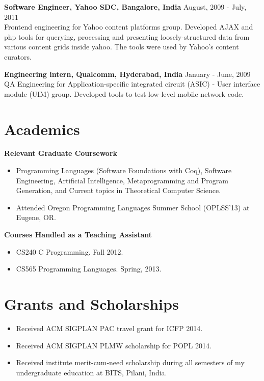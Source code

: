 \documentclass[margin,line]{res}
\begin{document}
\begin{resume}
{\bf Software Engineer, Yahoo SDC, Bangalore, India} \hfill August, 2009 -
July, 2011\\
Frontend engineering for Yahoo content platforms group. Developed AJAX
and php tools for querying, processing and presenting
loosely-structured data from various content grids inside yahoo. The
tools were used by Yahoo's content curators.

{\bf Engineering intern, Qualcomm, Hyderabad, India} \hfill January - June, 2009\\
QA Engineering for Application-specific integrated circuit (ASIC) -
User interface module (UIM) group. Developed tools to test low-level
mobile network code.\\

\section{Academics}
{\bf Relevant Graduate Coursework }\\
\begin{itemize}
\item Programming Languages (Software Foundations with Coq), Software
Engineering, Artificial Intelligence, Metaprogramming and Program
Generation, and Current topics in Theoretical Computer Science.
\item Attended Oregon Programming Languages Summer School (OPLSS'13)
at Eugene, OR.
\end{itemize}

{\bf Courses Handled as a Teaching Assistant}\\
\begin{itemize}
\item CS240 C Programming. Fall 2012.
\item CS565 Programming Languages. Spring, 2013.
\end{itemize}

\section{Grants and Scholarships}
\begin{itemize}
\item Received ACM SIGPLAN PAC travel grant for ICFP 2014.
\item Received ACM SIGPLAN PLMW scholarship for POPL 2014.
\item Received institute merit-cum-need scholarship during all 
semesters of my undergraduate education at BITS, Pilani, India.
\end{itemize}


\end{resume}
\end{document}
